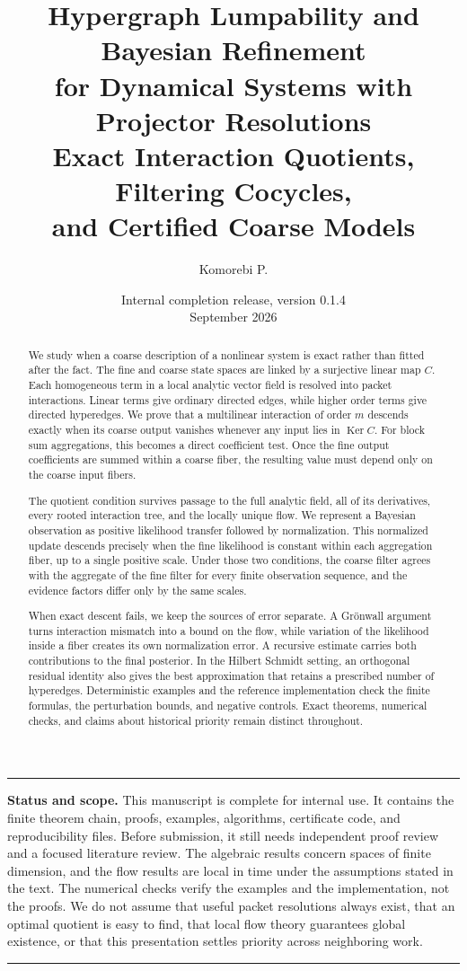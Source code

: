 \documentclass[11pt]{article}
\title{\textbf{Hypergraph Lumpability and Bayesian Refinement\\
for Dynamical Systems with Projector Resolutions}\\[0.4em]
\large Exact Interaction Quotients, Filtering Cocycles,\\
and Certified Coarse Models}
\author{Komorebi P.}
\date{Internal completion release, version 0.1.4\\September 2026}
\theoremstyle{definition}
\theoremstyle{remark}
\newcommand{\Ker}{\operatorname{Ker}}
\newenvironment{statusbox}
{\begin{center}\begin{minipage}{0.94\linewidth}\hrule\vspace{0.6em}\small}
{\vspace{0.6em}\hrule\end{minipage}\end{center}}
\begin{document}
\maketitle

\begin{abstract}
We study when a coarse description of a nonlinear system is exact rather than fitted after the fact.  The fine and coarse state spaces are linked by a surjective linear map $C$.  Each homogeneous term in a local analytic vector field is resolved into packet interactions.  Linear terms give ordinary directed edges, while higher order terms give directed hyperedges.  We prove that a multilinear interaction of order $m$ descends exactly when its coarse output vanishes whenever any input lies in $\Ker C$.  For block sum aggregations, this becomes a direct coefficient test.  Once the fine output coefficients are summed within a coarse fiber, the resulting value must depend only on the coarse input fibers.

The quotient condition survives passage to the full analytic field, all of its derivatives, every rooted interaction tree, and the locally unique flow.  We represent a Bayesian observation as positive likelihood transfer followed by normalization.  This normalized update descends precisely when the fine likelihood is constant within each aggregation fiber, up to a single positive scale.  Under those two conditions, the coarse filter agrees with the aggregate of the fine filter for every finite observation sequence, and the evidence factors differ only by the same scales.

When exact descent fails, we keep the sources of error separate.  A Grönwall argument turns interaction mismatch into a bound on the flow, while variation of the likelihood inside a fiber creates its own normalization error.  A recursive estimate carries both contributions to the final posterior.  In the Hilbert Schmidt setting, an orthogonal residual identity also gives the best approximation that retains a prescribed number of hyperedges.  Deterministic examples and the reference implementation check the finite formulas, the perturbation bounds, and negative controls.  Exact theorems, numerical checks, and claims about historical priority remain distinct throughout.
\end{abstract}

\begin{statusbox}
\textbf{Status and scope.}
This manuscript is complete for internal use.  It contains the finite theorem chain, proofs, examples, algorithms, certificate code, and reproducibility files.  Before submission, it still needs independent proof review and a focused literature review.  The algebraic results concern spaces of finite dimension, and the flow results are local in time under the assumptions stated in the text.  The numerical checks verify the examples and the implementation, not the proofs.  We do not assume that useful packet resolutions always exist, that an optimal quotient is easy to find, that local flow theory guarantees global existence, or that this presentation settles priority across neighboring work.
\end{statusbox}
\end{document}
